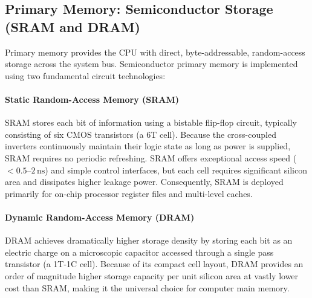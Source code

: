 
\subsection{Primary Memory: Semiconductor Storage (SRAM and DRAM)}\label{sec:primary_memory}

Primary memory provides the CPU with direct, byte-addressable, random-access storage across the system bus. Semiconductor primary memory is implemented using two fundamental circuit technologies:

\paragraph{Static Random-Access Memory (SRAM)}
SRAM stores each bit of information using a bistable flip-flop circuit, typically consisting of six CMOS transistors (a 6T cell). Because the cross-coupled inverters continuously maintain their logic state as long as power is supplied, SRAM requires no periodic refreshing. SRAM offers exceptional access speed ($< 0.5\text{--}2\,\text{ns}$) and simple control interfaces, but each cell requires significant silicon area and dissipates higher leakage power. Consequently, SRAM is deployed primarily for on-chip processor register files and multi-level caches.

\paragraph{Dynamic Random-Access Memory (DRAM)}
DRAM achieves dramatically higher storage density by storing each bit as an electric charge on a microscopic capacitor accessed through a single pass transistor (a 1T-1C cell). Because of its compact cell layout, DRAM provides an order of magnitude higher storage capacity per unit silicon area at vastly lower cost than SRAM, making it the universal choice for computer main memory.

